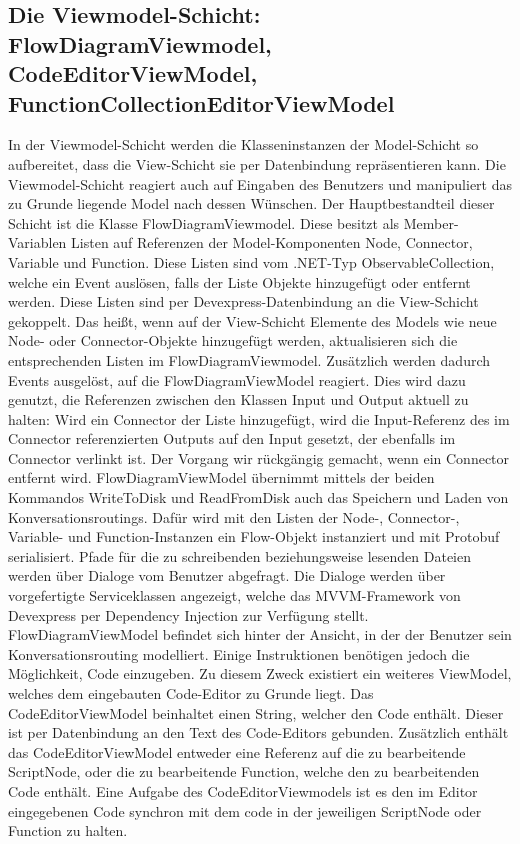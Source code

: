 \subsection{Die Viewmodel-Schicht: FlowDiagramViewmodel, CodeEditorViewModel, FunctionCollectionEditorViewModel}
\label{subsec:Die Viewmodel-Schicht}
In der Viewmodel-Schicht werden die Klasseninstanzen der Model-Schicht so aufbereitet, dass die View-Schicht sie per Datenbindung repräsentieren kann. Die Viewmodel-Schicht reagiert auch auf Eingaben des Benutzers und manipuliert das zu Grunde liegende Model nach dessen Wünschen. 
\newline
Der Hauptbestandteil dieser Schicht ist die Klasse FlowDiagramViewmodel. Diese besitzt als Member-Variablen Listen auf Referenzen der Model-Komponenten Node, Connector, Variable und Function. Diese Listen sind vom .NET-Typ ObservableCollection, welche ein Event auslösen, falls der Liste Objekte hinzugefügt oder entfernt werden. Diese Listen sind per Devexpress-Datenbindung an die View-Schicht gekoppelt. Das heißt, wenn auf der View-Schicht Elemente des Models wie neue Node- oder Connector-Objekte hinzugefügt werden, aktualisieren sich die entsprechenden Listen im FlowDiagramViewmodel. Zusätzlich werden dadurch Events ausgelöst, auf die FlowDiagramViewModel reagiert. Dies wird dazu genutzt, die Referenzen zwischen den Klassen Input und Output aktuell zu halten: Wird ein Connector der Liste hinzugefügt, wird die Input-Referenz des im Connector referenzierten Outputs auf den Input gesetzt, der ebenfalls im Connector verlinkt ist. Der Vorgang wir rückgängig gemacht, wenn ein Connector entfernt wird. FlowDiagramViewModel übernimmt mittels der beiden Kommandos WriteToDisk und ReadFromDisk auch das Speichern und Laden von Konversationsroutings. Dafür wird mit den Listen der Node-, Connector-, Variable- und Function-Instanzen ein Flow-Objekt instanziert und mit Protobuf serialisiert. Pfade für die zu schreibenden beziehungsweise lesenden Dateien werden über Dialoge vom Benutzer abgefragt. Die Dialoge werden über vorgefertigte Serviceklassen angezeigt, welche das MVVM-Framework von Devexpress per Dependency Injection zur Verfügung stellt. 
\newline
FlowDiagramViewModel befindet sich hinter der Ansicht, in der der Benutzer sein Konversationsrouting modelliert. Einige Instruktionen benötigen jedoch die Möglichkeit, Code einzugeben. Zu diesem Zweck existiert ein weiteres ViewModel, welches dem eingebauten Code-Editor zu Grunde liegt. Das CodeEditorViewModel beinhaltet einen String, welcher den Code enthält. Dieser ist per Datenbindung an den Text des Code-Editors gebunden. Zusätzlich enthält das CodeEditorViewModel entweder eine Referenz auf die zu bearbeitende ScriptNode, oder die zu bearbeitende Function, welche den zu bearbeitenden Code enthält. Eine Aufgabe des CodeEditorViewmodels ist es den im Editor eingegebenen Code synchron mit dem code in der jeweiligen ScriptNode oder Function zu halten. 
